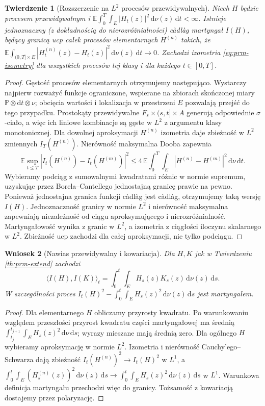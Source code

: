 \documentclass[11pt,a4paper,oneside]{report}
\numberwithin{equation}{chapter}
\theoremstyle{plain}
\newtheorem{twierdzenie}{Twierdzenie}[chapter]
\newtheorem{wniosek}[twierdzenie]{Wniosek}
\theoremstyle{definition}
\theoremstyle{remark}
\newcommand{\Prob}{\mathbb{P}}
\newcommand{\E}{\mathbb{E}}
\newcommand{\dd}{\mathrm{d}}
\begin{document}
\begin{twierdzenie}[Rozszerzenie na $L^2$ procesów przewidywalnych]\label{thm:volIII:11:04}
\label{th:prm-extend}
Niech $H$ będzie procesem przewidywalnym i
$\E\int_0^T\int_E |H_t(z)|^2\,\dd\nu(z)\,\dd t<\infty$.
Istnieje jednoznaczny (z dokładnością do nierozróżnialności)
càdlàg martyngał $I(H)$, będący granicą ucp całek
procesów elementarnych $H^{(n)}$ takich, że
$\E\int_{(0,T]\times E}|H_t^{(n)}(z)-H_t(z)|^2\,\dd\nu(z)\,\dd t\to0$.
Zachodzi izometria \eqref{eq:prm-isometry} dla wszystkich
procesów tej klasy i dla każdego $t\in[0,T]$.
\end{twierdzenie}
\begin{proof}
Gęstość procesów elementarnych otrzymujemy następująco.
Wystarczy najpierw rozważyć funkcje ograniczone, wspierane
na zbiorach skończonej miary $\Prob\otimes\dd t\otimes\nu$;
obcięcia wartości i lokalizacja w przestrzeni $E$ pozwalają
przejść do tego przypadku. Prostokąty przewidywalne
$F_s\times(s,t]\times A$ generują odpowiednie $\sigma$-ciało,
a więc ich liniowe kombinacje są gęste w $L^2$ z
argumentu klasy monotonicznej. Dla dowolnej aproksymacji
$H^{(n)}$ izometria daje zbieżność w $L^2$ zmiennych
$I_T(H^{(n)})$. Nierówność maksymalna Dooba zapewnia
\[
\E\sup_{t\le T}|I_t(H^{(n)})-I_t(H^{(m)})|^2
\le4\,\E\int_0^T\int_E|H^{(n)}-H^{(m)}|^2
\,\dd\nu\,\dd t.
\]
Wybieramy podciąg z sumowalnymi kwadratami różnic
w normie supremum, uzyskując przez Borela--Cantellego
jednostajną granicę prawie na pewno. Ponieważ jednostajna
granica funkcji càdlàg jest càdlàg, otrzymujemy taką
wersję $I(H)$. Jednoznaczność granicy w normie $L^2$
i nierówność maksymalna zapewniają niezależność od ciągu
aproksymującego i nierozróżnialność. Martyngałowość
wynika z granic w $L^2$, a izometria z ciągłości iloczynu
skalarnego w $L^2$. Zbieżność ucp zachodzi dla całej
aproksymacji, nie tylko podciągu.
\end{proof}

\begin{wniosek}[Nawias przewidywalny i kowariacja]\label{cor:volIII:11:01}
\label{cor:prm-angle}
Dla $H,K$ jak w Twierdzeniu \ref{th:prm-extend} zachodzi
\[
\langle I(H),I(K)\rangle_t
=\int_0^t\int_EH_s(z)K_s(z)\,\dd\nu(z)\,\dd s.
\]
W szczególności proces $I_t(H)^2-\int_0^t\int_EH_s(z)^2
\,\dd\nu(z)\,\dd s$ jest martyngałem.
\end{wniosek}
\begin{proof}
Dla elementarnego $H$ obliczamy przyrosty kwadratu.
Po warunkowaniu względem przeszłości przyrost kwadratu
części martyngałowej ma średnią
$\int_{t_j}^{t_{j+1}}\int_EH_s(z)^2\,\dd\nu\,\dd s$;
wyrazy mieszane mają średnią zero. Dla ogólnego $H$
wybieramy aproksymację w normie $L^2$. Izometria i
nierówność Cauchy'ego--Schwarza dają zbieżność
$I_t(H^{(n)})^2\to I_t(H)^2$ w $L^1$, a
$\int_0^t\int_E(H_s^{(n)}(z))^2\,\dd\nu(z)\,\dd s\to
\int_0^t\int_E H_s(z)^2\,\dd\nu(z)\,\dd s$ w $L^1$.
Warunkowa definicja martyngału przechodzi więc do granicy.
Tożsamość z kowariacją dostajemy przez polaryzację.
\end{proof}
\end{document}
